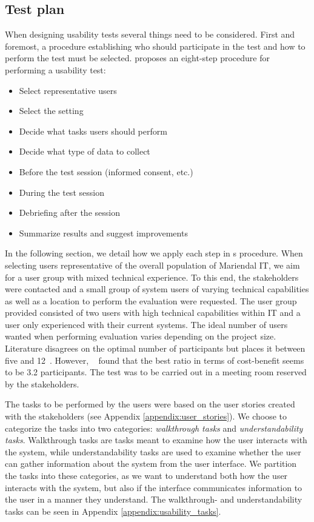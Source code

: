 \subsection{Test plan}\label{sec:prototype_test_plan}
When designing usability tests several things need to be considered.
First and foremost, a procedure establishing who should participate in the test and how to perform the test must be selected.
\citeauthor{lazar2005web} \cite{lazar2005web,researchmethodsinhumancomputerinteraction} proposes an eight-step procedure for performing a usability test:
\begin{itemize}
\item Select representative users
\item Select the setting
\item Decide what tasks users should perform
\item Decide what type of data to collect
\item Before the test session (informed consent, etc.)
\item During the test session
\item Debriefing after the session
\item Summarize results and suggest improvements
\end{itemize}
In the following section, we detail how we apply each step in \citeauthor{lazar2005web}s procedure.
When selecting users representative of the overall population of Mariendal IT, we aim for a user group with mixed technical experience. 
To this end, the stakeholders were contacted and a small group of system users of varying technical capabilities as well as a location to perform the evaluation were requested. 
The user group provided consisted of two users with high technical capabilities within IT and a user only experienced with their current systems.
The ideal number of users wanted when performing evaluation varies depending on the project size\cite{NielsenLandauer1993}. 
Literature disagrees on the optimal number of participants but places it between five\cite{virzi_HowManySubjectsIsEnough} and 12~\cite{Hwang_PeopleRequiredForUsabilityEvaluation}.
However, \citeauthor{NielsenLandauer1993}~\cite{NielsenLandauer1993} found that the best ratio in terms of cost-benefit seems to be 3.2 participants.  
The test was to be carried out in a meeting room reserved by the stakeholders. 

The tasks to be performed by the users were based on the user stories created with the stakeholders (see Appendix \ref{appendix:user_stories}).
We choose to categorize the tasks into two categories: \textit{walkthrough tasks} and \textit{understandability tasks}.
Walkthrough tasks are tasks meant to examine how the user interacts with the system, while understandability tasks are used to examine whether the user can gather information about the system from the user interface. 
We partition the tasks into these categories, as we want to understand both how the user interacts with the system, but also if the interface communicates information to the user in a manner they understand.
The walkthrough- and understandability tasks can be seen in Appendix \ref{appendix:usability_tasks}.

